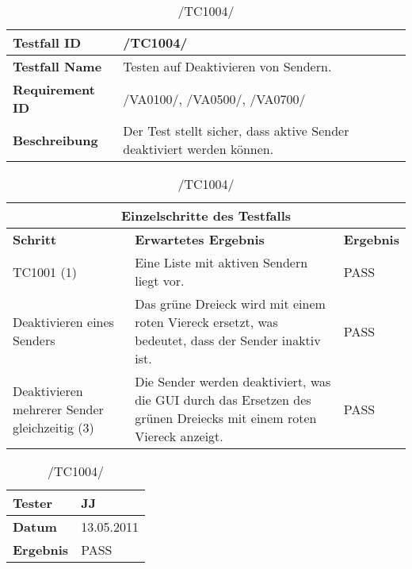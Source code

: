 \begin{table}[h]
\caption{/TC1004/}
\label{tab:TC1004}
\begin{center}
\begin{tabular}{|p{3.5cm}|p{11cm}|}
\hline
\textbf{Testfall ID} & /TC1004/\\
\hline
\textbf{Testfall Name} & Testen auf Deaktivieren von Sendern.
\\
\hline
\textbf{Requirement ID} & /VA0100/, /VA0500/, /VA0700/\\
\hline
\textbf{Beschreibung} & Der Test stellt sicher, dass aktive Sender deaktiviert
werden können.
\\
\hline
\end{tabular}
\begin{tabular}{|p{4cm}|p{7.8cm}|p{2.3cm}|}
\multicolumn{3}{|c|}{\textbf{Einzelschritte des Testfalls}} \\
\hline
\textbf{Schritt} & \textbf{Erwartetes Ergebnis} & \textbf{Ergebnis}\\
\hline
TC1001 (1) & Eine Liste
 mit aktiven Sendern liegt vor. & PASS
\\
\hline
Deaktivieren eines Senders & Das grüne Dreieck wird mit einem roten Viereck
 ersetzt, was bedeutet, dass der Sender inaktiv ist. & PASS
 \\
\hline
Deaktivieren mehrerer Sender gleichzeitig (3) & Die Sender werden
deaktiviert, was die GUI durch das Ersetzen des grünen Dreiecks mit einem roten
Viereck anzeigt. & PASS
 \\
\hline
\end{tabular}
\begin{tabular}{|p{3.5cm}|p{11cm}|}
\textbf{Tester} & JJ\\
\hline
\textbf{Datum} & 13.05.2011\\
\hline
\textbf{Ergebnis} & PASS\\
\hline
\end{tabular}
\end{center}
\end{table}

